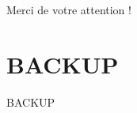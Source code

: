 \documentclass[usenames,dvipsnames]{beamer}
\begin{document}
\begin{frame}
\begin{center}
Merci de votre attention !
\end{center}
\end{frame}

\appendix
\section{BACKUP}
\begin{frame}
\begin{center}
\LARGE
BACKUP
\end{center}
\end{frame}

\begin{frame}
\tableofcontents
\end{frame}












\end{document}

